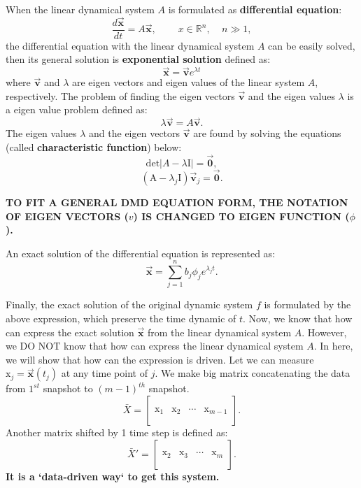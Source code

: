 \documentclass[onecolumn]{IEEEtran}
\begin{document}
When the linear dynamical system $A$ is formulated as \textbf{differential equation}:
$$\frac{d\vec{\mathbf{x}}}{dt} = A \vec{\mathbf{x}},~~~~~~~~~~x \in \mathbb{R}^n,~~~~~n \gg 1,$$
the differential equation with the linear dynamical system $A$ can be easily solved, then its general solution is \textbf{exponential solution} defined as:
$$\vec{\mathbf{x}}=\vec{\mathbf{v}}e^{\lambda t}$$
where $\vec{\mathbf{v}}$ and $\lambda$ are eigen vectors and eigen values of the linear system $A$, respectively.
The problem of finding the eigen vectors $\vec{\mathbf{v}}$ and the eigen values $\lambda$ is a eigen value problem defined as:
$$\lambda \vec{\mathbf{v}} = A\vec{\mathbf{v}}.$$
The eigen values $\lambda$ and the eigen vectors $\vec{\mathbf{v}}$ are found by solving the equations (called \textbf{characteristic function}) below:
$$ \mathrm{det}|\textit{A} - \lambda\mathrm{I}| = \vec{\mathbf{0}},$$
$$ (\mathrm{A} - \lambda_j \mathrm{I})\vec{\mathbf{v}}_j = \vec{\mathbf{0}}.$$ 

\textbf{TO FIT A GENERAL DMD EQUATION FORM, THE NOTATION OF EIGEN VECTORS ($v$) IS CHANGED TO EIGEN FUNCTION ($\phi$).}

An exact solution of the differential equation is represented as:
$$\vec{\mathbf{x}} = \sum_{j=1}^{n}{b_j \phi_j e^{\lambda_{j}t}}.$$

Finally, the exact solution of the original dynamic system $f$ is formulated by the above expression, which preserve the time dynamic of $t$.
Now, we know that how can express the exact solution $\vec{\mathbf{x}}$ from the linear dynamical system $A$. However, we DO NOT know that how can express the linear dynamical system $A$. In here, we will show that how can the expression is driven.
Let we can measure $\mathrm{x}_j = \vec{\mathbf{x}}(t_j)$ at any time point of $j$.
We make big matrix concatenating the data from $1^{st}$ snapshot to $(m-1)^{th}$ snapshot.
$$ 
\bar{X} = 
\begin{bmatrix}
  &  &  &  \\
  &  &  &  \\
\mathrm{x}_1 & \mathrm{x}_2 & \cdots & \mathrm{x}_{m-1}\\
  &  &  &  \\
  &  &  &  
\end{bmatrix}.
$$
Another matrix shifted by 1 time step is defined as:
$$ 
\bar{X}' = 
\begin{bmatrix}
  &  &  &  \\
  &  &  &  \\
\mathrm{x}_2 & \mathrm{x}_3 & \cdots & \mathrm{x}_{m}\\
  &  &  &  \\
  &  &  &  
\end{bmatrix}.
$$
\textbf{It is a `data-driven way` to get this system.}\\
\end{document}
